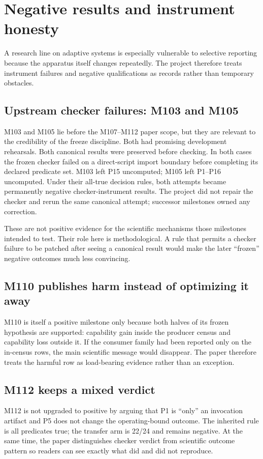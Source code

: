 \section{Negative results and instrument honesty}
\label{sec:negative}
A research line on adaptive systems is especially vulnerable to selective reporting because the apparatus itself changes repeatedly. The project therefore treats instrument failures and negative qualifications as records rather than temporary obstacles.

\subsection{Upstream checker failures: M103 and M105}
M103 and M105 lie before the M107--M112 paper scope, but they are relevant to the credibility of the freeze discipline. Both had promising development rehearsals. Both canonical results were preserved before checking. In both cases the frozen checker failed on a direct-script import boundary before completing its declared predicate set. M103 left P15 uncomputed; M105 left P1--P16 uncomputed. Under their all-true decision rules, both attempts became permanently negative checker-instrument results. The project did not repair the checker and rerun the same canonical attempt; successor milestones owned any correction.

These are not positive evidence for the scientific mechanisms those milestones intended to test. Their role here is methodological. A rule that permits a checker failure to be patched after seeing a canonical result would make the later ``frozen'' negative outcomes much less convincing.

\subsection{M110 publishes harm instead of optimizing it away}
M110 is itself a positive milestone only because both halves of its frozen hypothesis are supported: capability gain inside the producer census and capability loss outside it. If the consumer family had been reported only on the in-census rows, the main scientific message would disappear. The paper therefore treats the harmful row as load-bearing evidence rather than an exception.

\subsection{M112 keeps a mixed verdict}
M112 is not upgraded to positive by arguing that P1 is ``only'' an invocation artifact and P5 does not change the operating-bound outcome. The inherited rule is all predicates true; the transfer arm is 22/24 and remains negative. At the same time, the paper distinguishes checker verdict from scientific outcome pattern so readers can see exactly what did and did not reproduce.

